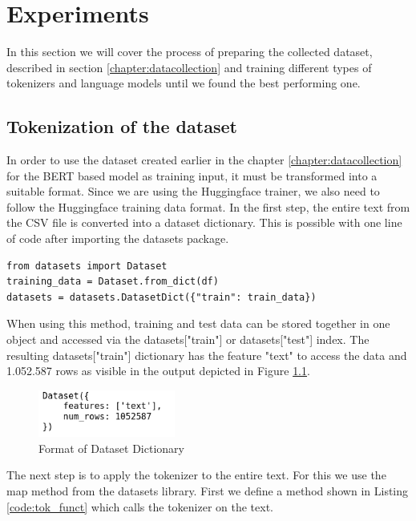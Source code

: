\chapter{Experiments} \label{chapter:experiments}
In this section we will cover the process of preparing the collected dataset, described in section \ref{chapter:datacollection} and training different types of tokenizers and language models until we found the best performing one.

\section{Tokenization of the dataset}
In order to use the dataset created earlier in the chapter \ref{chapter:datacollection} for the BERT based model as training input, it must be transformed into a suitable format. Since we are using the Huggingface trainer, we also need to follow the Huggingface training data format. \newline
In the first step, the entire text from the CSV file is converted into a dataset dictionary. This is possible with one line of code after importing the datasets package.

\begin{code}
\label{code:dict}
\begin{verbatim}
from datasets import Dataset
training_data = Dataset.from_dict(df)
datasets = datasets.DatasetDict({"train": train_data})
	\end{verbatim}
\end{code}

When using this method, training and test data can be stored together in one object and accessed via the datasets["train"] or datasets["test"] index. The resulting datasets["train"] dictionary has the feature "text" to access the data and 1.052.587 rows as visible in the output depicted in Figure \ref{fig:dict_features}.
\begin{figure}[H]
	\centering
	\includegraphics[width=0.4\textwidth]{figures/dataset_dict_features.png}
	\caption{Format of Dataset Dictionary}
	\label{fig:dict_features}
\end{figure}

The next step is to apply the tokenizer to the entire text. For this we use the map method from the datasets library. First we define a method shown in Listing \ref{code:tok_funct} which calls the tokenizer on the text.

